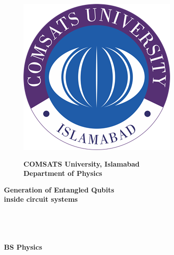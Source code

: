 \documentclass[12pt,two side]{report}
\begin{document}
\begin{titlepage}
\begin{center}
\begin{figure}
\begin{minipage}{0.1\linewidth}
\includegraphics[scale=0.27]{comsatslogo.png}              %
\end{minipage}                                             %
\begin{minipage}[c]{\linewidth}                            %
 \centering                                                %
  \textbf{\LARGE COMSATS University, Islamabad}\\          %
         \textbf{\LARGE Department of Physics}             %
\end{minipage}                                             %
\end{figure}                                               %
\textbf{\huge Generation of Entangled Qubits \\inside circuit systems} \vspace{0.5cm}\\
\vspace{0.5cm}\\
\vspace{2cm}\\
\vspace{1cm}\\
\vspace{2cm}\\
\textbf{\huge BS Physics}\vspace{2cm}\\
 \vspace{0.5cm}\\

\end{center}
\end{titlepage}
\end{document}
